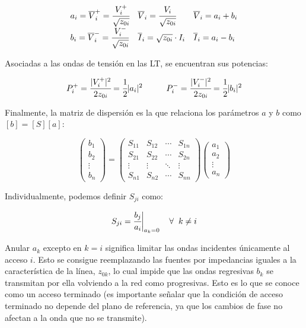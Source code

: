 \documentclass[12pt]{article}
\begin{document}
$$\begin{array}{lll}
	a_i = \overline{V}_i^+ = \cfrac{V_i^+}{\sqrt{z_{0i}}} & \overline{V}_i = \cfrac{V_i}{\sqrt{z_{0i}}} &  \overline{V}_i = a_i + b_i\\
	b_i = \overline{V}_i^- = \cfrac{V_i^-}{\sqrt{z_{0i}}} & \overline{I}_i = \sqrt{z_{0i}} \cdot I_i &  \overline{I}_i = a_i - b_i
\end{array}$$

Asociadas a las ondas de tensi\'on en las LT, se encuentran sus potencias:

$$P_i^+ = \cfrac{|V_i^+|^2}{2z_{0i}} = \cfrac{1}{2} |a_i|^2 \hspace{1cm} P_i^-  = \cfrac{|V_i^-|^2}{2z_{0i}} = \cfrac{1}{2} |b_i|^2$$

Finalmente, la matriz de dispersi\'on es la que relaciona los par\'ametros $a$ y $b$ como $[b] = [S][a]$:

$$\left(\begin{array}{c}
	b_1 \\
	b_2 \\
	\vdots \\
	b_n
\end{array}\right)
=
\left(\begin{array}{cccc}
	S_{11} & S_{12} & \cdots & S_{1n} \\
	S_{21} & S_{22} & \cdots & S_{2n} \\
	\vdots & \vdots & \ddots & \vdots \\
	S_{n1} & S_{n2} & \cdots & S_{nn}
\end{array}
\right)
\left(\begin{array}{c}
	a_1 \\
	a_2 \\
	\vdots \\
	a_n
\end{array}\right)$$

Individualmente, podemos definir $S_{ji}$ como:

$$S_{ji} = \cfrac{b_j}{a_i}\bigg|_{a_k = 0} \hspace{4mm} \forall \hspace{2mm} k \neq i$$

Anular $a_k$ excepto en $k=i$ significa limitar las ondas incidentes \'unicamente al acceso $i$. Esto se consigue reemplazando las fuentes por impedancias iguales a la caracter\'istica de la l\'inea, $z_{0k}$, lo cual impide que las ondas regresivas $b_k$ se transmitan por ella volviendo a la red como progresivas. Esto es lo que se conoce como un acceso terminado (es importante se\~nalar que la condici\'on de acceso terminado no depende del plano de referencia, ya que los cambios de fase no afectan a la onda que no se transmite).
\end{document}

